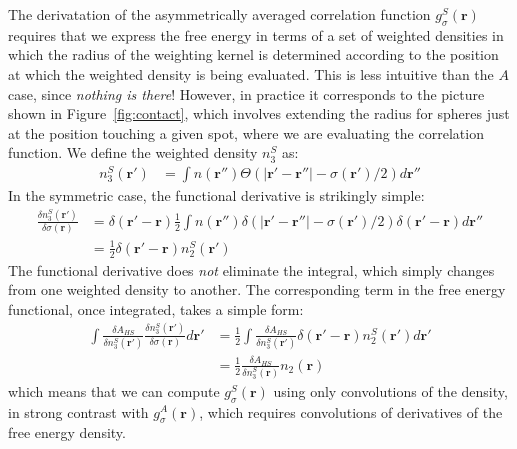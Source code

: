 \documentclass[letterpaper,twocolumn,amsmath,amssymb,jcp,10pt,aip]{revtex4-1}
\newcommand{\rr}{\textbf{r}}
\begin{document}
\begin{widetext}
The derivatation of the asymmetrically averaged correlation function
$g_\sigma^S(\rr)$ requires that we express the free energy in terms of
a set of weighted densities in which the radius of the weighting
kernel is determined according to the position at which the weighted
density is being evaluated.  This is less intuitive than the $A$ case,
since \emph{nothing is there}!  However, in practice it corresponds to
the picture shown in Figure~\ref{fig:contact}, which involves
extending the radius for spheres just at the position touching a
given spot, where we are evaluating the correlation function.  We
define the weighted density $n_3^S$ as:
\begin{align}
  n_3^{S}(\rr') &= \int n(\rr'') \Theta(\left|\rr' - \rr''\right| -\sigma(\rr')/2) d\rr''
\end{align}
In the symmetric case, the functional derivative is strikingly simple:
\begin{align}
   \frac{\delta n_3^{S} (\rr')}{\delta \sigma(\rr)} &=
   \delta(\rr'-\rr) \frac 12 \int n (\rr'') \delta(|\rr' - \rr''| - \sigma(\rr')/2)
   \delta(\rr'-\rr) d\rr''
   \\
   &= \frac 12 \delta(\rr'-\rr) n_2^S(\rr')
\end{align}
The functional derivative does \emph{not} eliminate the integral,
which simply changes from one weighted density to another.  The
corresponding term in the free energy functional, once integrated,
takes a simple form:
\begin{align}
  \int \frac{\delta A_{HS}}{\delta n_3^{S}(\rr')}
  \frac{\delta n_3^{S}(\rr')}{\delta \sigma(\rr)} d\rr'
  &= \frac 12 \int \frac{\delta A_{HS}}{\delta n_3^{S}(\rr')} \delta(\rr'-\rr)
  n_2^S(\rr') d\rr' \\
  &= \frac 12 \frac{\delta A_{HS}}{\delta n_3^{S}(\rr)} n_2(\rr)
\end{align}
which means that we can compute $g_\sigma^S(\rr)$ using only
convolutions of the density, in strong contrast with
$g_\sigma^A(\rr)$, which requires convolutions of derivatives of the
free energy density.


\end{widetext}
\end{document}
